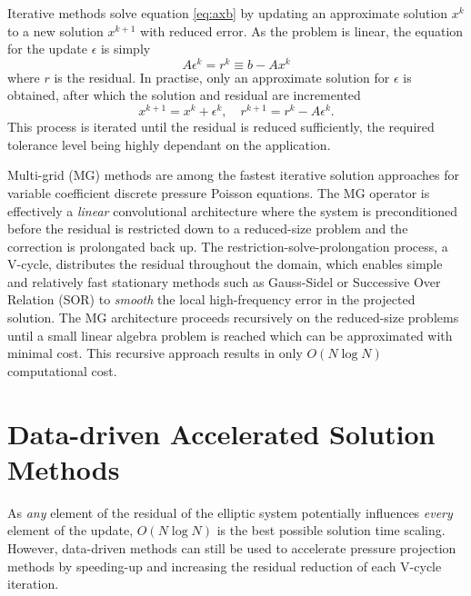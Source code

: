 \documentclass[review]{elsarticle}
\begin{document}
Iterative methods solve equation \ref{eq:axb} by updating an approximate solution $x^k$ to a new solution $x^{k+1}$ with reduced error. As the problem is linear, the equation for the update $\epsilon$ is simply
\begin{equation}
    A \epsilon^k = r^k \equiv b - Ax^k
\end{equation}
where $r$ is the residual. In practise, only an approximate solution for $\epsilon$ is obtained, after which the solution and residual are incremented
\begin{equation}
    x^{k+1} = x^k+\epsilon^k, \quad r^{k+1} = r^k-A\epsilon^k.
\end{equation}
This process is iterated until the residual is reduced sufficiently, the required tolerance level being highly dependant on the application.

Multi-grid (MG) methods are among the fastest iterative solution approaches for variable coefficient discrete pressure Poisson equations. The MG operator is effectively a \textit{linear} convolutional architecture where the system is preconditioned before the residual is restricted down to a reduced-size problem and the correction is prolongated back up. 
The restriction-solve-prolongation process, a V-cycle, distributes the residual throughout the domain, which enables simple and relatively fast stationary methods such as Gauss-Sidel or Successive Over Relation (SOR) to \textit{smooth} the local high-frequency error in the projected solution. The MG architecture proceeds recursively on the reduced-size problems until a small linear algebra problem is reached which can be approximated with minimal cost. This recursive approach results in only $O(N\log N)$ computational cost.

\section{Data-driven Accelerated Solution Methods}

As \textit{any} element of the residual of the elliptic system potentially influences \textit{every} element of the update, $O(N\log N)$ is the best possible solution time scaling. However, data-driven methods can still be used to accelerate pressure projection methods by speeding-up and increasing the residual reduction of each V-cycle iteration.
\end{document}
